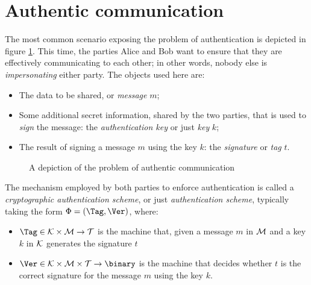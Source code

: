 
\section{Authentic communication}

The most common scenario exposing the problem of authentication is depicted in figure \ref{fig:authentication}. This time, the parties Alice and Bob want to ensure that they are effectively communicating to each other; in other words, nobody else is \emph{impersonating} either party. The objects used here are:
\begin{itemize}
    \item The data to be shared, or \emph{message} $m$;
    \item Some additional secret information, shared by the two parties, that is used to \emph{sign} the message: the \emph{authentication key} or just \emph{key} $k$;
    \item The result of signing a message $m$ using the key $k$: the \emph{signature} or \emph{tag} $t$.
\end{itemize}

\begin{figure}[ht]
    \centering

    \caption{A depiction of the problem of authentic communication}
    \label{fig:authentication}
\end{figure}

The mechanism employed by both parties to enforce authentication is called a \emph{cryptographic authentication scheme}, or just \emph{authentication scheme}, typically taking the form $\Phi = (\Tag, \Ver)$, where:
\begin{itemize}
    \item $\Tag \in \K \times \M \to \T$ is the machine that, given a message $m$ in $\mathcal{M}$ and a key $k$ in $\mathcal{K}$ generates the signature $t$
    \item $\Ver \in \K \times \M \times \T \to \binary$ is the machine that decides whether $t$ is the correct signature for the message $m$ using the key $k$.
\end{itemize}


